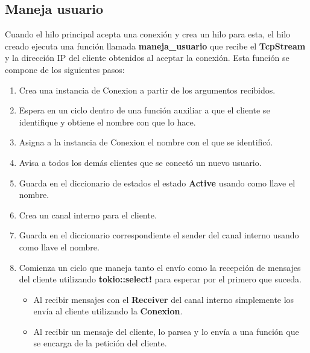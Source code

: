 \documentclass[11pt]{article}
\begin{document}
\subsection{Maneja usuario}
Cuando el hilo principal acepta una conexión y crea un hilo para esta, el hilo creado ejecuta una función llamada \textbf{maneja\_usuario} que recibe el \textbf{TcpStream} y la dirección IP del cliente obtenidos al aceptar la conexión. Esta función se compone de los siguientes pasos:
\begin{enumerate}
    \item Crea una instancia de Conexion a partir de los argumentos recibidos.
    \item Espera en un ciclo dentro de una función auxiliar a que el cliente se identifique y obtiene el nombre con que lo hace.
    \item Asigna a la instancia de Conexion el nombre con el que se identificó.
    \item Avisa a todos los demás clientes que se conectó un nuevo usuario.
    \item Guarda en el diccionario de estados el estado \textbf{Active} usando como llave el nombre.
    \item Crea un canal interno para el cliente.
    \item Guarda en el diccionario correspondiente el sender del canal interno usando como llave el nombre.
    \item Comienza un ciclo que maneja tanto el envío como la recepción de mensajes del cliente utilizando \textbf{tokio::select!} para esperar por el primero que suceda.
    \begin{itemize}
        \item Al recibir mensajes con el \textbf{Receiver} del canal interno simplemente los envía al cliente utilizando la \textbf{Conexion}.
        \item Al recibir un mensaje del cliente, lo parsea y lo envía a una función que se encarga de la petición del cliente.
    \end{itemize}
\end{enumerate}
\end{document}
